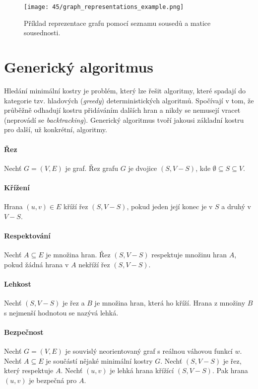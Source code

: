 \begin{figure}[H]
    \centering
    \texttt{[image: 45/graph\_representations\_example.png]}
    \caption{Příklad reprezentace grafu pomocí seznamu sousedů a matice sousednosti.}
\end{figure}


\section{Generický algoritmus}

Hledání minimální kostry je problém, který lze řešit algoritmy, které spadají do kategorie tzv. hladových (\textit{greedy}) deterministických algoritmů. Spočívají v tom, že průběžně odhadují kostru přidáváním dalších hran a nikdy se nemusejí vracet (neprovádí se \textit{backtracking}). Generický algoritmus tvoří jakousi základní kostru pro další, už konkrétní, algoritmy.

\paragraph*{Řez} Nechť $G = (V, E)$ je graf. Řez grafu $G$ je dvojice $(S, V - S)$, kde $\emptyset \subseteq S \subseteq V$.

\paragraph*{Křížení} Hrana $(u, v) \in E$ kříží řez $(S, V - S)$, pokud jeden její konec je v $S$ a druhý v $V - S$.

\paragraph*{Respektování} Nechť $A \subseteq E$ je množina hran. Řez $(S, V - S)$ respektuje množinu hran $A$, pokud žádná hrana v $A$ nekříží řez $(S, V - S)$.

\paragraph*{Lehkost} Nechť $(S, V - S)$ je řez a $B$ je množina hran, která ho kříží. Hrana z množiny $B$ s nejmenší hodnotou se nazývá lehká.

\paragraph*{Bezpečnost} Nechť $G = (V, E)$ je souvislý neorientovaný graf s reálnou váhovou funkcí $w$. Nechť $A \subseteq E$ je součástí nějaké minimální kostry $G$. Nechť $(S, V - S)$ je řez, který respektuje $A$. Nechť $(u, v)$ je lehká hrana křížící $(S, V - S)$. Pak hrana $(u, v)$ je bezpečná pro $A$.

